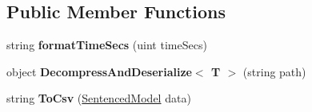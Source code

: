 \subsection*{Public Member Functions}
\begin{DoxyCompactItemize}
\item 
\mbox{\label{class_b_n_a30_1_1_form1_a8c500f118cd3247435e9291ffaa69fe1}} 
string {\bfseries format\+Time\+Secs} (uint time\+Secs)
\item 
\mbox{\label{class_b_n_a30_1_1_form1_ac9fc6058ae8fbd3f771331f413c7f558}} 
object {\bfseries Decompress\+And\+Deserialize$<$ T $>$} (string path)
\item 
\mbox{\label{class_b_n_a30_1_1_form1_ac22c0507f4de267553513ee281e1329d}} 
string {\bfseries To\+Csv} (\mbox{\hyperlink{class_b_n_a30_1_1_form1_1_1_sentenced_model}{Sentenced\+Model}} data)
\end{DoxyCompactItemize}
